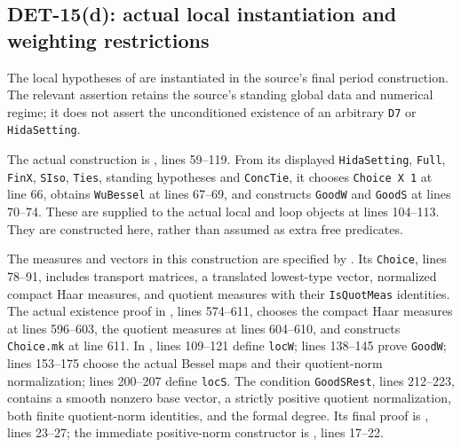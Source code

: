 \subsection{DET-15(d): actual local instantiation and weighting restrictions}

The local hypotheses of  are instantiated in the source's
final period construction.  The relevant assertion retains the source's
standing global data and numerical regime; it does not assert the
unconditioned existence of an arbitrary \texttt{D7} or
\texttt{HidaSetting}.

The actual construction is
,
lines 59--119.  From its displayed \texttt{HidaSetting}, \texttt{Full},
\texttt{FinX}, \texttt{SIso}, \texttt{Ties}, standing hypotheses and
\texttt{ConcTie}, it chooses \texttt{Choice X 1} at line 66, obtains
\texttt{WuBessel} at lines 67--69, and constructs
\texttt{GoodW} and \texttt{GoodS} at lines 70--74.  These are supplied
to the actual local and loop objects at lines 104--113.
They are constructed here, rather than assumed as extra free predicates.

The measures and vectors in this construction are specified by
.
Its \texttt{Choice}, lines 78--91, includes transport matrices, a
translated lowest-type vector, normalized compact Haar measures, and
quotient measures with their \texttt{IsQuotMeas} identities.
The actual existence proof in
,
lines 574--611, chooses the compact Haar measures at lines 596--603,
the quotient measures at lines 604--610, and constructs
\texttt{Choice.mk} at line 611.  In ,
lines 109--121 define \texttt{locW}; lines 138--145 prove
\texttt{GoodW}; lines 153--175 choose the actual Bessel maps and
their quotient-norm normalization; lines 200--207 define
\texttt{locS}.  The condition \texttt{GoodSRest}, lines 212--223,
contains a smooth nonzero base vector, a strictly positive quotient
normalization, both finite quotient-norm identities, and the formal
degree.  Its final proof is
,
lines 23--27; the immediate positive-norm constructor is
,
lines 17--22.

